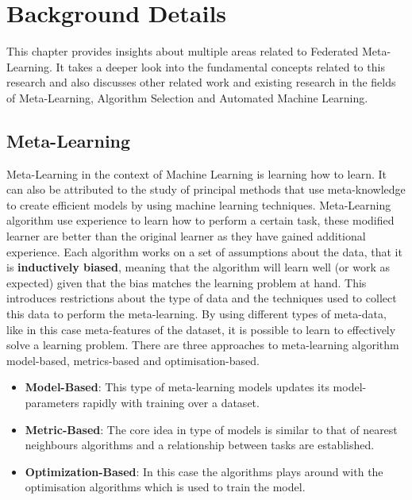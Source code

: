 \chapter{Background Details}

This chapter provides insights about multiple areas related to Federated Meta-Learning. It takes a deeper look into the fundamental concepts related to this research and also discusses other related work and existing research in the fields of Meta-Learning, Algorithm Selection and Automated Machine Learning.

\section{Meta-Learning}
Meta-Learning in the context of Machine Learning is learning how to learn. It can also be attributed to the study of principal methods that use meta-knowledge to create efficient models by using machine learning techniques. Meta-Learning algorithm use experience to learn how to perform a certain task, these modified learner are better than the original learner as they have gained additional experience. Each algorithm works on a set of assumptions about the data, that it is \textbf{inductively biased}, meaning that the algorithm will learn well (or work as expected) given that the bias matches the learning problem at hand. This introduces restrictions about the type of data and the techniques used to collect this data to perform the meta-learning. By using different types of meta-data, like in this case meta-features of the dataset, it is possible to learn to effectively solve a learning problem. There are three approaches to meta-learning algorithm model-based, metrics-based and optimisation-based.

\begin{itemize}
    \item \textbf{Model-Based}:
    This type of meta-learning models updates its model-parameters rapidly with training over a dataset.
    \item \textbf{Metric-Based}:
    The core idea in type of models is similar to that of nearest neighbours algorithms and a relationship between tasks are established.
    \item \textbf{Optimization-Based}:
    In this case the algorithms plays around with the optimisation algorithms which is used to train the model.
\end{itemize}

